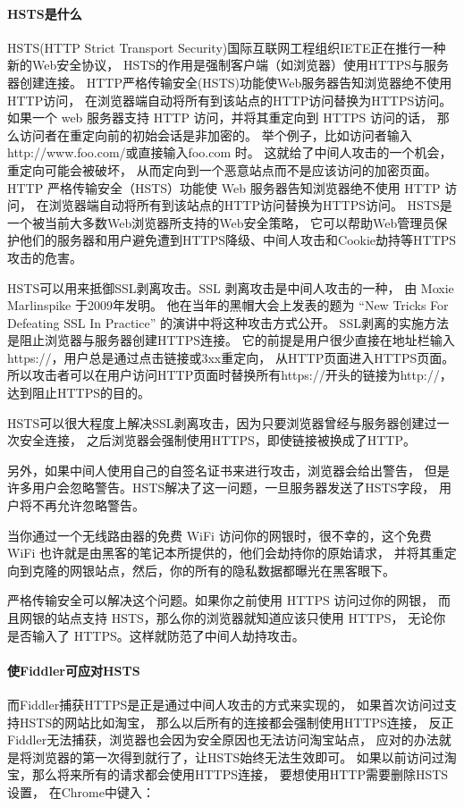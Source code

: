 \documentclass{book}
\begin{document}
\paragraph{HSTS是什么}HSTS(HTTP Strict Transport Security)国际互联网工程组织IETE正在推行一种新的Web安全协议，
HSTS的作用是强制客户端（如浏览器）使用HTTPS与服务器创建连接。
HTTP严格传输安全(HSTS)功能使Web服务器告知浏览器绝不使用HTTP访问，
在浏览器端自动将所有到该站点的HTTP访问替换为HTTPS访问。
如果一个 web 服务器支持 HTTP 访问，并将其重定向到 HTTPS 访问的话，
那么访问者在重定向前的初始会话是非加密的。
举个例子，比如访问者输入http://www.foo.com/或直接输入foo.com 时。
这就给了中间人攻击的一个机会，重定向可能会被破坏，
从而定向到一个恶意站点而不是应该访问的加密页面。
HTTP 严格传输安全（HSTS）功能使 Web 服务器告知浏览器绝不使用 HTTP 访问，
在浏览器端自动将所有到该站点的HTTP访问替换为HTTPS访问。
HSTS是一个被当前大多数Web浏览器所支持的Web安全策略，
它可以帮助Web管理员保护他们的服务器和用户避免遭到HTTPS降级、中间人攻击和Cookie劫持等HTTPS攻击的危害。

HSTS可以用来抵御SSL剥离攻击。SSL 剥离攻击是中间人攻击的一种，
由 Moxie Marlinspike 于2009年发明。
他在当年的黑帽大会上发表的题为 “New Tricks For Defeating SSL In Practice” 的演讲中将这种攻击方式公开。
SSL剥离的实施方法是阻止浏览器与服务器创建HTTPS连接。
它的前提是用户很少直接在地址栏输入https://，用户总是通过点击链接或3xx重定向，
从HTTP页面进入HTTPS页面。所以攻击者可以在用户访问HTTP页面时替换所有https://开头的链接为http://，
达到阻止HTTPS的目的。

HSTS可以很大程度上解决SSL剥离攻击，因为只要浏览器曾经与服务器创建过一次安全连接，
之后浏览器会强制使用HTTPS，即使链接被换成了HTTP。

另外，如果中间人使用自己的自签名证书来进行攻击，浏览器会给出警告，
但是许多用户会忽略警告。HSTS解决了这一问题，一旦服务器发送了HSTS字段，
用户将不再允许忽略警告。

当你通过一个无线路由器的免费 WiFi 访问你的网银时，很不幸的，这个免费 WiFi 也许就是由黑客的笔记本所提供的，他们会劫持你的原始请求，
并将其重定向到克隆的网银站点，然后，你的所有的隐私数据都曝光在黑客眼下。

严格传输安全可以解决这个问题。如果你之前使用 HTTPS 访问过你的网银，
而且网银的站点支持 HSTS，那么你的浏览器就知道应该只使用 HTTPS，
无论你是否输入了 HTTPS。这样就防范了中间人劫持攻击。

\paragraph{使Fiddler可应对HSTS} 而Fiddler捕获HTTPS是正是通过中间人攻击的方式来实现的，
如果首次访问过支持HSTS的网站比如淘宝，
那么以后所有的连接都会强制使用HTTPS连接，
反正Fiddler无法捕获，浏览器也会因为安全原因也无法访问淘宝站点，
应对的办法就是将浏览器的第一次得到就行了，让HSTS始终无法生效即可。
如果以前访问过淘宝，那么将来所有的请求都会使用HTTPS连接，
要想使用HTTP需要删除HSTS设置，
在Chrome中键入：
\end{document}
